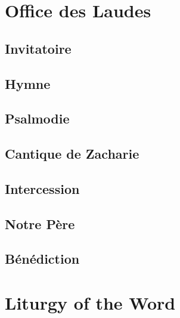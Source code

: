 \section[Office des Laudes]{Office des Laudes}
\begin{french}

\subsection*{Invitatoire}




\subsection*{Hymne}


\subsection*{Psalmodie}








\subsection*{Cantique de Zacharie}


\subsection*{Intercession}


\subsection*{Notre Père}




\subsection*{Bénédiction}

\end{french}

\newpage
\section[Liturgy of the Word]{Liturgy of the Word}
\begin{english}







\end{english}

